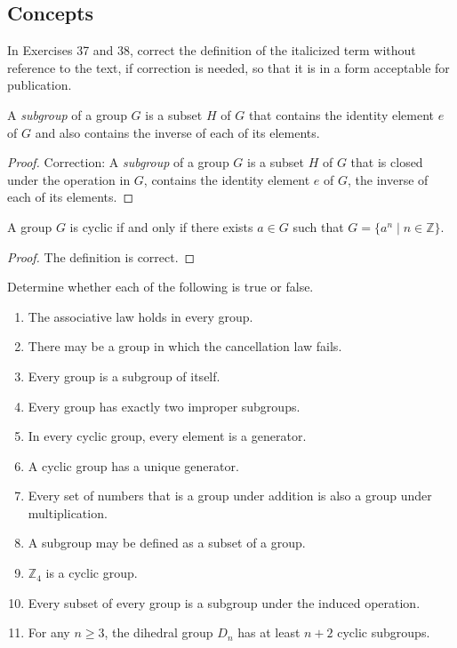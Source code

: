 \subsection*{Concepts}

In Exercises 37 and 38, correct the definition of the italicized term without reference to the text, if correction is needed, so that it is in a form acceptable for publication.

\newpage
\begin{exercise}
    A \textit{subgroup} of a group $G$ is a subset $H$ of $G$ that contains the identity element $e$ of $G$ and also contains the inverse of each of its elements.
\end{exercise}

\begin{proof}
    Correction: A \textit{subgroup} of a group $G$ is a subset $H$ of $G$ that is closed under the operation in $G$, contains the identity element $e$ of $G$, the inverse of each of its elements.
\end{proof}

\newpage
\begin{exercise}
    A group $G$ is cyclic if and only if there exists $a\in G$ such that $G = \{ a^{n} \mid n\in\mathbb{Z} \}$.
\end{exercise}

\begin{proof}
    The definition is correct.
\end{proof}

\newpage
\begin{exercise}
    Determine whether each of the following is true or false.
    \begin{enumerate}[label={\textbf{\alph*}}]
        \item The associative law holds in every group.
        \item There may be a group in which the cancellation law fails.
        \item Every group is a subgroup of itself.
        \item Every group has exactly two improper subgroups.
        \item In every cyclic group, every element is a generator.
        \item A cyclic group has a unique generator.
        \item Every set of numbers that is a group under addition is also a group under multiplication.
        \item A subgroup may be defined as a subset of a group.
        \item $\mathbb{Z}_{4}$ is a cyclic group.
        \item Every subset of every group is a subgroup under the induced operation.
        \item For any $n \geq 3$, the dihedral group $D_{n}$ has at least $n + 2$ cyclic subgroups.
    \end{enumerate}
\end{exercise}

